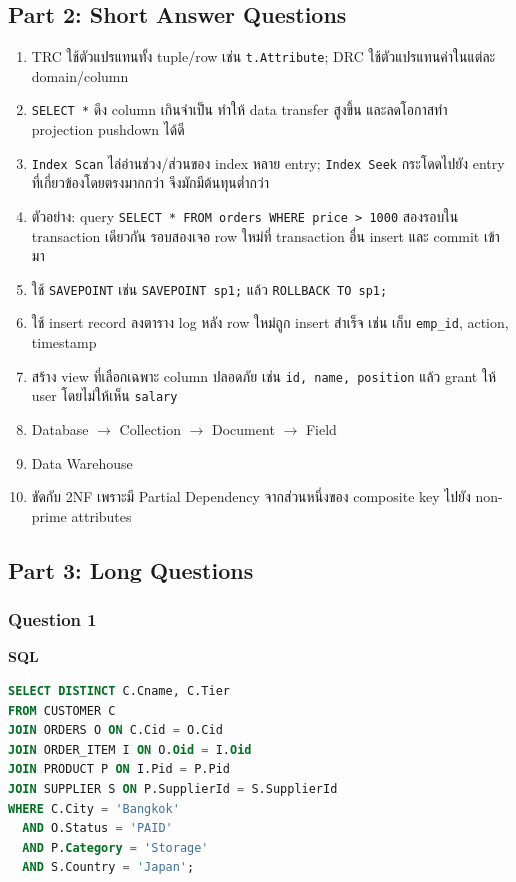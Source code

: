 \documentclass[a4paper,12pt]{article}
\begin{document}
\subsection*{Part 2: Short Answer Questions}
\begin{enumerate}[label=\textbf{\arabic*.}]
    \item TRC ใช้ตัวแปรแทนทั้ง tuple/row เช่น \texttt{t.Attribute}; DRC ใช้ตัวแปรแทนค่าในแต่ละ domain/column
    \item \texttt{SELECT *} ดึง column เกินจำเป็น ทำให้ data transfer สูงขึ้น และลดโอกาสทำ projection pushdown ได้ดี
    \item \texttt{Index Scan} ไล่อ่านช่วง/ส่วนของ index หลาย entry; \texttt{Index Seek} กระโดดไปยัง entry ที่เกี่ยวข้องโดยตรงมากกว่า จึงมักมีต้นทุนต่ำกว่า
    \item ตัวอย่าง: query \texttt{SELECT * FROM orders WHERE price > 1000} สองรอบใน transaction เดียวกัน รอบสองเจอ row ใหม่ที่ transaction อื่น insert และ commit เข้ามา
    \item ใช้ \texttt{SAVEPOINT} เช่น \texttt{SAVEPOINT sp1;} แล้ว \texttt{ROLLBACK TO sp1;}
    \item ใช้ insert record ลงตาราง log หลัง row ใหม่ถูก insert สำเร็จ เช่น เก็บ \texttt{emp\_id}, action, timestamp
    \item สร้าง view ที่เลือกเฉพาะ column ปลอดภัย เช่น \texttt{id, name, position} แล้ว grant ให้ user โดยไม่ให้เห็น \texttt{salary}
    \item Database $\rightarrow$ Collection $\rightarrow$ Document $\rightarrow$ Field
    \item Data Warehouse
    \item ขัดกับ 2NF เพราะมี Partial Dependency จากส่วนหนึ่งของ composite key ไปยัง non-prime attributes
\end{enumerate}

\subsection*{Part 3: Long Questions}

\subsubsection*{Question 1}
\textbf{SQL}
\begin{lstlisting}[language=SQL]
SELECT DISTINCT C.Cname, C.Tier
FROM CUSTOMER C
JOIN ORDERS O ON C.Cid = O.Cid
JOIN ORDER_ITEM I ON O.Oid = I.Oid
JOIN PRODUCT P ON I.Pid = P.Pid
JOIN SUPPLIER S ON P.SupplierId = S.SupplierId
WHERE C.City = 'Bangkok'
  AND O.Status = 'PAID'
  AND P.Category = 'Storage'
  AND S.Country = 'Japan';
\end{lstlisting}
\end{document}
